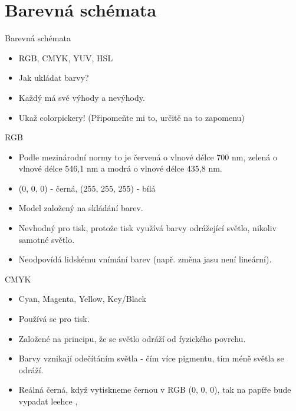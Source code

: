 \documentclass[aspectratio=169,xcolor=dvipsnames, t]{beamer}
\begin{document}
{\section{Barevná schémata}
\begin{frame}{Barevná schémata}
    \begin{itemize}
        \item RGB, CMYK, YUV, HSL
        \item Jak ukládat barvy?
        \item Každý má své výhody a nevýhody.
        \item Ukaž colorpickery! (Připomeňte mi to, určitě na to zapomenu)
    \end{itemize}
\end{frame}
\begin{frame}{RGB}
\begin{itemize}
    \item Podle mezinárodní normy to je červená o vlnové délce 700 nm, zelená o vlnové délce 546,1 nm a modrá o vlnové délce 435,8 nm.
    \item (0, 0, 0) - černá, (255, 255, 255) - bílá
    \item Model založený na skládání barev.
    \item Nevhodný pro tisk, protože tisk využívá barvy odrážející světlo, nikoliv samotné světlo.
    \item Neodpovídá lidskému vnímání barev (např. změna jasu není lineární).
\end{itemize}
\end{frame}
\begin{frame}{CMYK}
    \begin{itemize}
        \item Cyan, Magenta, Yellow, Key/Black
        \item Používá se pro tisk.
        \item Založené na principu, že se světlo odráží od fyzického povrchu.
        \item Barvy vznikají odečítáním světla - čím více pigmentu, tím méně světla se odráží.
        \item Reálná černá, když vytiskneme černou v RGB (0, 0, 0), tak na papíře bude vypadat leehce , 
    \end{itemize}
\end{frame}

}
\end{document}
